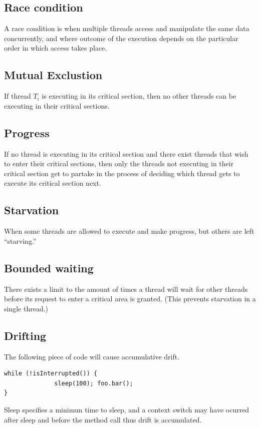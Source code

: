 \documentclass[a4paper]{article}
\begin{document}
\subsection{Race condition}
A race condition is when multiple threads access and manipulate the same
data concurrently, and where outcome of the execution depends on the
particular order in which access takes place.

\subsection{Mutual Exclustion}
If thread $T_i$ is executing in its critical section, then no other threads
can be executing in their critical sections.

\subsection{Progress}
If no thread is executing in its critical section and there exist threads
that wish to enter their critical sections, then only the threads not executing
in their critical section get to partake in the process of deciding which
thread gets to execute its critical section next.

\subsection{Starvation}
When some threads are allowed to execute and make progress, but others are
left ``starving.''

\subsection{Bounded waiting}
There exists a limit to the amount of times a thread will wait for other
threads before its request to enter a critical area is granted. (This
prevents starvation in a single thread.)

\subsection{Drifting}
The following piece of code will cause accumulative drift.
\begin{lstlisting}[label=drift,caption=Drift example]
while (!isInterrupted()) {
              sleep(100); foo.bar();
}
\end{lstlisting}

Sleep specifies a minimun time to sleep, and a context switch may have ocurred
after sleep and before the method call thus drift is accumulated.
\end{document}
